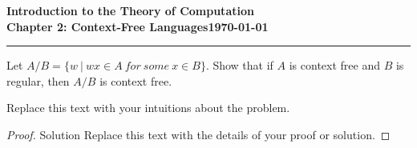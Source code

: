 \documentclass[11pt]{article}
\newcommand{\dated}{\today}
\begin{document}
\textbf{Introduction to the Theory of
Computation}\hfill\textbf{\myname}\\[0.01in]
\textbf{Chapter 2: Context-Free Languages}\hfill\textbf{\dated}\\
\smallskip\hrule\bigskip

\begin{problem}{2.20}
Let $A/B = \{w \ | \ wx \in A \ for \ some \ x \in B\}$. Show that if $A$ is context free and $B$ is regular, then $A/B$ is context free.
\end{problem}

\begin{idea}
Replace this text with your intuitions about the problem.
\end{idea}

\begin{proof}
Solution Replace this text with the details of your proof or solution.
\end{proof}
\end{document}
